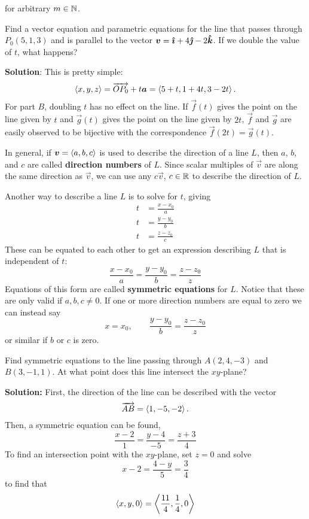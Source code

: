for arbitrary \(m\in \mathbb{N}\).
\begin{example}
    Find a vector equation and parametric equations for the line that passes through \(P_0(5,1,3)\) and is parallel to the vector \(\boldsymbol{v} = \boldsymbol{\hat{\imath}} + 4\boldsymbol{\hat{\jmath}} - 2\boldsymbol{\hat{k}}\). If we double the value of \(t\), what happens? \par \textbf{Solution}:
    This is pretty simple:
    \[\left\langle x,y,z\right\rangle = \overrightarrow{OP_0}+t\boldsymbol{a}= \left\langle5+t, 1+4t, 3-2t\right\rangle.\]
    For part \(B\), doubling \(t\) has no effect on the line. If \(\vec f(t)\) gives the point on the line given by \(t\) and \(\vec g(t)\) gives the point on the line given by \(2t\), \(\vec f\) and \(\vec g\) are easily observed to be bijective with the correspondence \(\vec f(2t) = \vec g(t)\).
\end{example}
In general, if \(\boldsymbol{v} = \left\langle a,b,c\right\rangle\) is used to describe the direction of a line \(L\), then \(a\), \(b\), and \(c\) are called \textbf{direction numbers} of \(L\). Since scalar multiples of \(\vec v\) are along the same direction as \(\vec v\), we can use any \(c\vec v\), \(c\in\mathbb{R}\) to describe the direction of \(L\). \par
Another way to describe a line \(L\) is to solve for \(t\), giving 
\begin{align*}
    t &= \frac{x-x_0}{a} \\
    t &= \frac{y-y_0}{b} \\
    t &= \frac{z-z_0}{c}
\end{align*}
These can be equated to each other to get an expression describing \(L\) that is independent of \(t\):
\[\frac{x-x_0}{a}=\frac{y-y_0}{b}=\frac{z-z_0}{z}\]
Equations of this form are called \textbf{symmetric equations} for \(L\). Notice that these are only valid if \(a,b,c\neq 0\). If one or more direction numbers are equal to zero we can instead say
\[x=x_0, \qquad\frac{y-y_0}{b}=\frac{z-z_0}{z}\]
or similar if \(b\) or \(c\) is zero.
\begin{example}
    Find symmetric equations to the line passing through \(A(2,4,-3)\) and \(B(3,-1,1)\). At what point does this line intersect the \(xy\)-plane? \par \textbf{Solution:} First, the direction of the line can be described with the vector \[\overrightarrow{AB}=\left\langle1, -5, -2\right\rangle.\]
    Then, a symmetric equation can be found,
    \[\frac{x-2}{1}=\frac{y-4}{-5}=\frac{z+3}{4}\]
    To find an intersection point with the \(xy\)-plane, set \(z=0\) and solve
    \[x-2=\frac{4-y}{5}=\frac{3}{4}\]
    to find that \[\left\langle x,y,0\right\rangle = \left\langle\frac{11}{4}, \frac{1}{4}, 0\right\rangle\]
\end{example}
